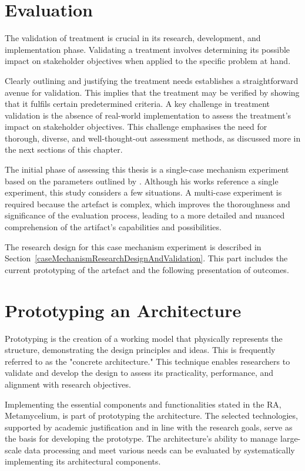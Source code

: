 \documentclass[preprint,12pt]{elsarticle}
\begin{document}
\section{Evaluation}
\label{sec:discussion}

The validation of treatment is crucial in its research, development, and implementation phase. Validating a treatment involves determining its possible impact on stakeholder objectives when applied to the specific problem at hand. 

Clearly outlining and justifying the treatment needs establishes a straightforward avenue for validation. This implies that the treatment may be verified by showing that it fulfils certain predetermined criteria. A key challenge in treatment validation is the absence of real-world implementation to assess the treatment's impact on stakeholder objectives. This challenge emphasises the need for thorough, diverse, and well-thought-out assessment methods, as discussed more in the next sections of this chapter. 

The initial phase of assessing this thesis is a single-case mechanism experiment based on the parameters outlined by \citeauthor{wieringa2014design}. Although his works reference a single experiment, this study considers a few situations. A multi-case experiment is required because the artefact is complex, which improves the thoroughness and significance of the evaluation process, leading to a more detailed and nuanced comprehension of the artifact's capabilities and possibilities. 

The research design for this case mechanism experiment is described in Section~\ref{caseMechanismResearchDesignAndValidation}. This part includes the current prototyping of the artefact and the following presentation of outcomes.


\section{Prototyping an Architecture}


Prototyping is the creation of a working model that physically represents the structure, demonstrating the design principles and ideas. This is frequently referred to as the "concrete architecture." This technique enables researchers to validate and develop the design to assess its practicality, performance, and alignment with research objectives.

Implementing the essential components and functionalities stated in the RA, Metamycelium, is part of prototyping the architecture. The selected technologies, supported by academic justification and in line with the research goals, serve as the basis for developing the prototype. The architecture's ability to manage large-scale data processing and meet various needs can be evaluated by systematically implementing its architectural components. 
\end{document}
